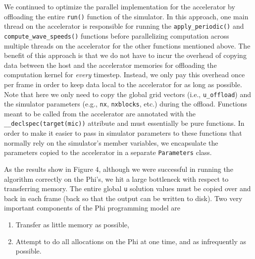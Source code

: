 We continued to optimize the parallel implementation for the accelerator
by offloading the entire \texttt{run()} function of the simulator. In
this approach, one main thread on the accelerator is responsible for
running the \texttt{apply\_periodic()} and \texttt{compute\_wave\_speeds()}
functions before parallelizing computation across multiple threads on the
accelerator for the other functions mentioned above. The benefit of this
approach is that we do not have to incur the overhead of copying data
between the host and the accelerator memories for offloading the
computation kernel for \emph{every} timestep. Instead, we only pay this
overhead once per frame in order to keep data local to the accelerator
for as long as possible. Note that here we only need to copy the global
grid vectors (i.e., \texttt{u\_offload}) and the simulator parameters
(e.g., \texttt{nx}, \texttt{nxblocks}, etc.) during the
offload. Functions meant to be called from the accelerator are annotated
with the \texttt{\_\_declspec(target(mic))} attribute and must
essentially be pure functions. In order to make it easier to pass in
simulator parameters to these functions that normally rely on the
simulator's member variables, we encapsulate the parameters copied to the
accelerator in a separate \texttt{Parameters} class.



As the results show in Figure 4, although we were successful in running the algorithm
correctly on the Phi's, we hit a large bottleneck with respect to transferring memory.
The entire global \texttt{u} solution values must be copied over and back in each
frame (back so that the output can be written to disk).  Two very important components
of the Phi programming model are

\begin{enumerate}[1.]
	\item Transfer as little memory as possible,
	\item Attempt to do all allocations on the Phi at one time, and as infrequently as possible.
\end{enumerate}

